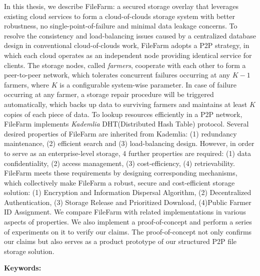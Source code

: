 \begin{abstracten}
  In this thesis, we describe FileFarm: a secured storage overlay that leverages existing cloud services to form a cloud-of-clouds storage system with better robustness, no single-point-of-failure and minimal data leakage concerns. To resolve the consistency and load-balancing issues caused by a centralized database design in conventional cloud-of-clouds work, FileFarm adopts a P2P strategy, in which each cloud operates as an independent node providing identical service for clients. The storage nodes, called \textit{farmers}, cooperate with each other to form a peer-to-peer network, which tolerates concurrent failures occurring at any $K-1$ farmers, where $K$ is a configurable system-wise parameter. In case of failure occurring at any farmer, a storage repair procedure will be triggered automatically, which backs up data to surviving farmers and maintains at least $K$ copies of each piece of data. To lookup resources efficiently in a P2P network, FileFarm implements \textit{Kademlia} DHT(Distributed Hash Table) protocol\cite{maymounkov2002kademlia}. Several desired properties of FileFarm are inherited from Kademlia: (1) redundancy maintenance, (2) efficient search and (3) load-balancing design. However, in order to serve as an enterprise-level storage, 4 further properties are required: (1) data confidentiality, (2) access management, (3) cost-efficiency, (4) retrievability. FileFarm meets these requirements by designing corresponding mechanisms, which collectively  make FileFarm a robust, secure and cost-efficient storage solution: (1) Encryption and Information Dispersal Algorithm, (2) Decentralized Authentication, (3) Storage Release and Prioritized Download, (4)Public Farmer ID Assignment. We compare FileFarm with related implementations in various aspects of properties. We also implement a proof-of-concept and perform a series of experiments on it to verify our claims.  The proof-of-concept not only confirms our claims but also serves as a product prototype of our structured P2P file storage solution.

\bigbreak
\noindent \textbf{Keywords:}{\, \makeatletter \@keywordsen \makeatother}
\end{abstracten}
